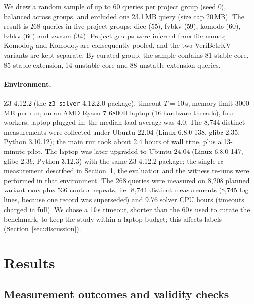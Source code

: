 \documentclass[11pt]{article}
\begin{document}
We drew a random sample of up to 60 queries per project group (seed 0), balanced across groups, and excluded one 23.1\,MB query (size cap 20\,MB). The result is 268 queries in five project groups: dice (55), fvbkv (59), komodo (60), lvbkv (60) and vwasm (34). Project groups were inferred from file names; Komodo$_D$ and Komodo$_S$ are consequently pooled, and the two VeriBetrKV variants are kept separate. By curated group, the sample contains 81 stable-core, 85 stable-extension, 14 unstable-core and 88 unstable-extension queries.

\paragraph{Environment.} Z3 4.12.2 (the \texttt{z3-solver} 4.12.2.0 package), timeout $T=10$\,s, memory limit 3000\,MB per run, on an AMD Ryzen 7 6800H laptop (16 hardware threads), four workers, laptop plugged in; the median load average was 4.0. The 8{,}744 distinct measurements were collected under Ubuntu 22.04 (Linux 6.8.0-138, glibc 2.35, Python 3.10.12); the main run took about 2.4 hours of wall time, plus a 13-minute pilot. The laptop was later upgraded to Ubuntu 24.04 (Linux 6.8.0-147, glibc 2.39, Python 3.12.3) with the same Z3 4.12.2 package; the single re-measurement described in Section~\ref{sec:results}, the evaluation and the witness re-runs were performed in that environment. The 268 queries were measured on 8{,}208 planned variant runs plus 536 control repeats, i.e.\ 8{,}744 distinct measurements (8{,}745 log lines, because one record was superseded) and 9.76 solver CPU hours (timeouts charged in full). We chose a 10\,s timeout, shorter than the 60\,s used to curate the benchmark, to keep the study within a laptop budget; this affects labels (Section~\ref{sec:discussion}).

\section{Results}
\label{sec:results}

\subsection{Measurement outcomes and validity checks}
\end{document}
